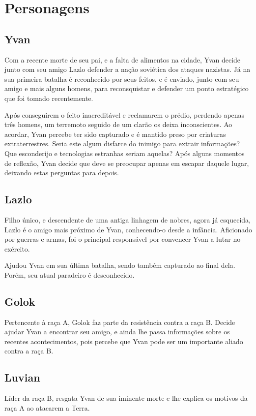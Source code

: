 \documentclass[12pt, a4paper]{article}
\begin{document}
\section{Personagens}
    \subsection{Yvan}
        Com a recente morte de seu pai, e a falta de alimentos na cidade, Yvan
        decide junto com seu amigo Lazlo defender a nação soviética dos ataques
        nazistas. Já na sua primeira batalha é reconhecido por seus feitos,
        e é enviado, junto com seu amigo e mais alguns homens, para reconsquistar
        e defender um ponto estratégico que foi tomado recentemente.

        Após conseguirem o feito inacreditável e reclamarem o prédio, perdendo
        apenas três homens, um terremoto seguido de um clarão os deixa inconscientes.
        Ao acordar, Yvan percebe ter sido capturado e é mantido preso por 
        criaturas extraterrestres. Seria este algum disfarce do inimigo para
        extrair informações? Que esconderijo e tecnologias estranhas seriam
        aquelas? Após alguns momentos de reflexão, Yvan decide que deve se 
        preocupar apenas em escapar daquele lugar, deixando estas perguntas
        para depois.

    \subsection{Lazlo}
        Filho único, e descendente de uma antiga linhagem de nobres, agora já
        esquecida, Lazlo é o amigo mais próximo de Yvan, conhecendo-o desde a 
        infância. Aficionado por guerras e armas, foi o principal responsável
        por convencer Yvan a lutar no exército.

        Ajudou Yvan em sua última batalha, sendo também capturado ao final dela.
        Porém, seu atual paradeiro é desconhecido.

    \subsection{Golok}
        Pertencente à raça A, Golok faz parte da resistência contra a raça B. Decide
        ajudar Yvan a encontrar seu amigo, e ainda lhe passa informações sobre
        os recentes acontecimentos, pois percebe que Yvan pode ser um importante
        aliado contra a raça B.

    \subsection{Luvian}
        Líder da raça B, resgata Yvan de sua iminente morte e lhe explica
        os motivos da raça A ao atacarem a Terra.
\end{document}
